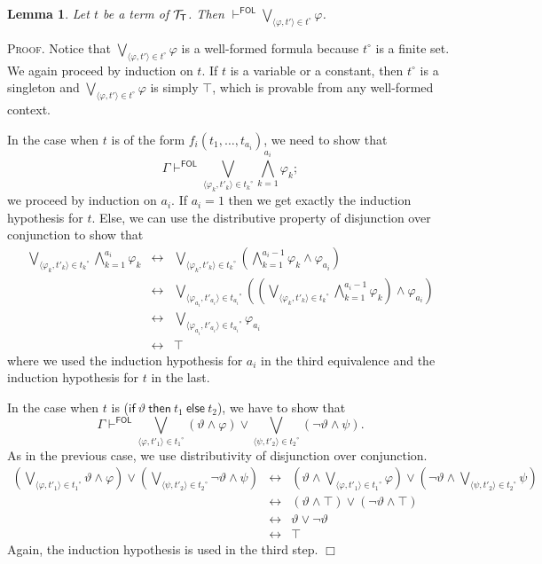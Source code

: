 \documentclass{article}
\newtheorem{lemma}[definition]{Lemma}
\newenvironment{proof}{\smallskip\textsc{Proof.}}{\hspace*{\fill}$\Box$}
\newcommand{\ifthelse}[3]{\ensuremath{\mathsf{if}\ {#1}\ \mathsf{then}\ {#2}\ \mathsf{else}\ {#3}}}
\newcommand{\ofun}[1]{\ensuremath{{#1}^\circ}}
\newcommand{\pair}[2]{\ensuremath{\langle{#1},{#2}\rangle}}
\newcommand{\terms}[1]{\ensuremath{{\cal T}_{\mathsf{#1}}}}
\newcommand{\myvdash}[1]{\ensuremath{\vdash^{\mathsf{#1}}}}
\begin{document}
\begin{lemma}\label{ofuntrue}
Let $t$ be a term of {\terms{T}}.
Then $\myvdash{FOL}\bigvee_{\pair\varphi{t'}\in\ofun{t}}\varphi$.
\end{lemma}
\begin{proof}
Notice that $\bigvee_{\pair\varphi{t'}\in\ofun t}\varphi$ is a well-formed
formula because {\ofun t} is a finite set.
We again proceed by induction on $t$.  If $t$ is a variable or a
constant, then {\ofun t} is a singleton and
$\bigvee_{\pair\varphi{t'}\in\ofun t}\varphi$ is simply $\top$, which
is provable from any well-formed context.

In the case when $t$ is of the form $f_i(t_1,\ldots,t_{a_i})$, we need
to show that
\[\Gamma\myvdash{FOL}\bigvee_{\pair{\varphi_k}{t'_k}\in\ofun{t_k}}
\bigwedge_{k=1}^{a_i} \varphi_k;\]
we proceed by induction on $a_i$.  If $a_i=1$ then we get exactly the
induction hypothesis for $t$.  Else, we can use the distributive property
of disjunction over conjunction to show that
\begin{eqnarray*}
\bigvee_{\pair{\varphi_k}{t'_k}\in\ofun{t_k}}\bigwedge_{k=1}^{a_i} \varphi_k
 & \leftrightarrow & \bigvee_{\pair{\varphi_k}{t'_k}\in\ofun{t_k}}
       \left(\bigwedge_{k=1}^{a_i-1}\varphi_k\wedge\varphi_{a_i}\right) \\
 & \leftrightarrow & \bigvee_{\pair{\varphi_{a_i}}{t'_{a_i}}\in\ofun{t_{a_i}}}
       \left(\left(\bigvee_{\pair{\varphi_k}{t'_k}\in\ofun{t_k}}
         \bigwedge_{k=1}^{a_i-1}\varphi_k\right)\wedge\varphi_{a_i}\right) \\
 & \leftrightarrow & \bigvee_{\pair{\varphi_{a_i}}{t'_{a_i}}\in\ofun{t_{a_i}}}
       \varphi_{a_i} \\
 & \leftrightarrow & \top
\end{eqnarray*}
where we used the induction hypothesis for $a_i$ in the third equivalence
and the induction hypothesis for $t$ in the last.

In the case when $t$ is {(\ifthelse\vartheta{t_1}{t_2})}, we have to show that
\[\Gamma\myvdash{FOL}\bigvee_{\pair{\varphi}{t'_1}\in\ofun{t_1}}
(\vartheta\wedge\varphi)\vee\bigvee_{\pair{\psi}{t'_2}\in\ofun{t_2}}
(\neg\vartheta\wedge\psi).\]
As in the previous case, we use distributivity of disjunction over
conjunction.
\begin{eqnarray*}
\left(\bigvee_{\pair{\varphi}{t'_1}\in\ofun{t_1}}\vartheta\wedge\varphi\right)
\vee\left(\bigvee_{\pair{\psi}{t'_2}\in\ofun{t_2}}\neg\vartheta\wedge\psi\right)
 & \leftrightarrow &
\left(\vartheta\wedge\bigvee_{\pair{\varphi}{t'_1}\in\ofun{t_1}}\varphi\right)
\vee\left(\neg\vartheta\wedge\bigvee_{\pair{\psi}{t'_2}\in\ofun{t_2}}\psi\right) \\
 & \leftrightarrow & (\vartheta\wedge\top)\vee(\neg\vartheta\wedge\top) \\
 & \leftrightarrow & \vartheta\vee\neg\vartheta \\
 & \leftrightarrow & \top
\end{eqnarray*}
Again, the induction hypothesis is used in the third step.
\end{proof}
\end{document}
